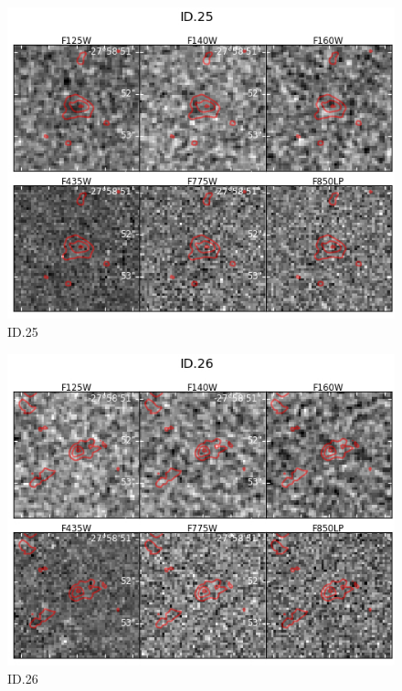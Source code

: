 \begin{figure}[tbp]
\centering \includegraphics[width=160mm]{Matched/ASPECS_Cutout_24.jpg}
\caption{ID.25}
\label{fig:Match_Three}
\end{figure}

\begin{figure}[tbp]
\centering \includegraphics[width=160mm]{Matched/ASPECS_Cutout_25.jpg}
\caption{ID.26}
\label{fig:Match_Three}
\end{figure}

